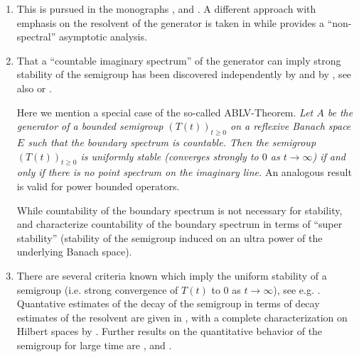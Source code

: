 \begin{enumerate}%

\item 

This is pursued in the monographs \textcite[Chapter V]{zbmath01354832}, 
\textcite[Sections 3 and 4]{zbmath00921898} and \textcite[Chapter III]{zbmath05625330}.
A different approach with emphasis on the resolvent of the generator is taken in 
\textcite[Chapter 5]{zbmath05842872} while  \textcite{zbmath05080033} provides a 
\enquote{non-spectral} asymptotic analysis.

\item
That a \enquote{countable imaginary spectrum} of the generator can imply strong stability of the semigroup has been discovered independently by  \textcite{zbmath04063855} and by \textcite{zbmath04042353}, see also
\textcite[Theorem 5.5.5]{zbmath05842872} or \textcite[Theorem 2.21]{zbmath01354832}.

Here we mention a  special case of the so-called ABLV-Theorem. 
\textit{Let $A$ be the generator of a bounded semigroup $(T(t))_{t\geq 0}$ on a reflexive Banach space $E$ such that the boundary spectrum is countable. 
Then the semigroup  $(T(t))_{t\geq 0}$ is uniformly stable (\ie converges strongly to $0$ as $t \rightarrow \infty$) if and only if there is no point spectrum on the imaginary line. }
An analogous result is valid for power bounded operators. 

While countability of the boundary spectrum  is not necessary for stability, 
\textcite{zbmath00410037} and \textcite{zbmath0493176} characterize countability of the boundary spectrum in terms of \enquote{super stability} (\ie stability of the semigroup induced on an ultra power of the underlying Banach space).


\item 
There are several criteria known which imply the uniform stability of a semigroup (i.e. strong convergence of $T(t)$ to $0$ as $t \rightarrow \infty$), see e.g. \textcite{zbmath05136549}.
Quantative estimates of the decay of the semigroup in terms of decay estimates of the resolvent are given in \textcite{zbmath05562661}, with a complete characterization on Hilbert spaces by \textcite{zbmath05700559}. 
Further results on the quantitative behavior of the semigroup for large time are \textcite{zbmath06575587}, \textcite{zbmath08146690} and 
\textcite{zbmath07114750}.



\end{enumerate}
